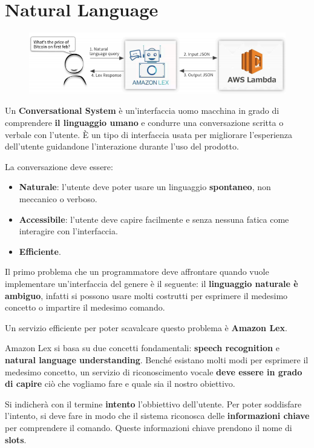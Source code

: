 \chapter{Natural Language}

\begin{figure}[!h]
	\includegraphics[scale=0.5]{immagini/Natural_language.png}
\end{figure}

Un \textbf{Conversational System} è un'interfaccia uomo macchina in grado di comprendere \textbf{il linguaggio umano} e condurre una conversazione scritta o verbale con l'utente. È un tipo di interfaccia usata per migliorare l'esperienza dell'utente guidandone l'interazione durante l'uso del prodotto.

La conversazione deve essere:
\begin{itemize}
	\item \textbf{Naturale}: l'utente deve poter usare un linguaggio \textbf{spontaneo}, non meccanico o verboso.
	\item \textbf{Accessibile}: l'utente deve capire facilmente e senza nessuna fatica come interagire con l'interfaccia.
	\item \textbf{Efficiente}.
\end{itemize}

Il primo problema che un programmatore deve affrontare quando vuole implementare un'interfaccia del genere è  il seguente: il \textbf{linguaggio naturale è ambiguo}, infatti si possono usare molti costrutti per esprimere il medesimo concetto o impartire il medesimo comando.

Un servizio efficiente per poter scavalcare questo problema è \textbf{Amazon Lex}.

Amazon Lex si basa su due concetti fondamentali: \textbf{speech recognition} e \textbf{natural language understanding}.
Benché esistano molti modi per esprimere il medesimo concetto, un servizio di riconoscimento vocale \textbf{deve essere in grado di capire} ciò che vogliamo fare e quale sia il nostro obiettivo.

Si indicherà con il termine \textbf{intento} l'obbiettivo dell'utente.
Per poter soddisfare l'intento, si deve fare in modo che il sistema riconosca delle \textbf{informazioni chiave} per comprendere il comando. Queste informazioni chiave prendono il nome di \textbf{slots}.

